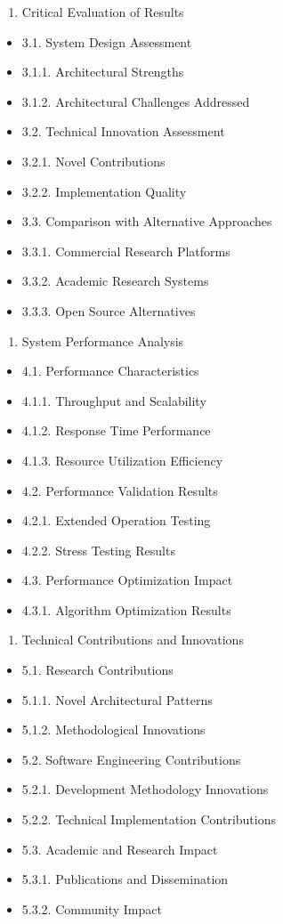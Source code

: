 \documentclass[11pt,a4paper]{report}
\begin{document}
\begin{enumerate}
\item Critical Evaluation of Results
\end{enumerate}
\begin{itemize}
\item 3.1. System Design Assessment
\item 3.1.1. Architectural Strengths
\item 3.1.2. Architectural Challenges Addressed
\item 3.2. Technical Innovation Assessment
\item 3.2.1. Novel Contributions
\item 3.2.2. Implementation Quality
\item 3.3. Comparison with Alternative Approaches
\item 3.3.1. Commercial Research Platforms
\item 3.3.2. Academic Research Systems
\item 3.3.3. Open Source Alternatives
\end{itemize}
\begin{enumerate}
\item System Performance Analysis
\end{enumerate}
\begin{itemize}
\item 4.1. Performance Characteristics
\item 4.1.1. Throughput and Scalability
\item 4.1.2. Response Time Performance
\item 4.1.3. Resource Utilization Efficiency
\item 4.2. Performance Validation Results
\item 4.2.1. Extended Operation Testing
\item 4.2.2. Stress Testing Results
\item 4.3. Performance Optimization Impact
\item 4.3.1. Algorithm Optimization Results
\end{itemize}
\begin{enumerate}
\item Technical Contributions and Innovations
\end{enumerate}
\begin{itemize}
\item 5.1. Research Contributions
\item 5.1.1. Novel Architectural Patterns
\item 5.1.2. Methodological Innovations
\item 5.2. Software Engineering Contributions
\item 5.2.1. Development Methodology Innovations
\item 5.2.2. Technical Implementation Contributions
\item 5.3. Academic and Research Impact
\item 5.3.1. Publications and Dissemination
\item 5.3.2. Community Impact
\end{itemize}
\end{document}
